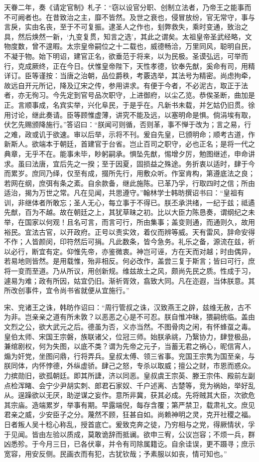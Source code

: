 \documentclass[]{article}
\begin{document}
天眷二年，奏《请定官制》札子：``窃以设官分职、创制立法者，乃帝王之能事而不可阙者也。在昔致治之主，靡不皆然。及世之衰也，侵冒放纷，官无常守，事与言戾，实由名丧，至于不可复振。逮圣人之作也，刬弊救失，乘时变通，致治之具，然后焕然一新，`九变复贯，知言之选'，其此之谓矣。太祖皇帝圣武经略，文物度数，曾不遑暇。太宗皇帝嗣位之十二载也，威德畅洽，万里同风，聪明自民，不凝于物。始下明诏，建官正名，欲垂范于将来，以为民极。圣谟弘远，可举而行，克成厥终，正在今日。伏惟皇帝陛下，天性孝德，钦奉先猷，奚命有司，用精详订。臣等谨按：当唐之治朝，品位爵秩，考覈选举，其法号为精密。尚虑拘牵，故远自开元所记，降及辽宋之传，参用讲求。有便于今者，不必泥古，取正于法者，亦无徇习。今先定到官号品次职守，上进御府，以尘乙览。恭俟圣断，曲加是正。言顺事成，名宾实举，兴化阜民，于是乎在。凡新书未载，并乞姑仍旧贯。徐用讨论，继此奏请。臣等顾惟虚薄，讲究不能及远，以塞明命是惧。倘涓埃有取，伏乞先赐颁降施行。''答诏曰：``朕闻可则循，否则革，事不惮于改为；言之易，行之难，政或讥于欲速。审以后举，示将不刊。爰自先皇，已颁明命；顺考古道，作新斯人。欲端本于朝廷，首建官于台省。岂止百司之职守，必也正名；是将一代之典章，无乎不在。能事未毕，眇躬嗣承。惧坠先猷，惕增夕厉，勉图继述，申命讲求。虽曰法唐，宜后先之一揆；至于因夏，固损益之殊途。务折衷以适时，肆于今而累岁。庶同乃绎，仅至有成，掇所先行，用敷众听。作室肯构，第遵底法之良；若网在纲，庶弭有条之紊。自余款备，继此施陈。已革乃孚，行取四时之信；所由适治，揭为万世之常。凡在见闻，共思遵守。''翰林学士韩昉撰诏书曰：``皇祖有训，非继体者所敢忘；圣人无心，每立事于不得已。朕丕承洪绪，一纪于兹；祗遹先猷，百为不越。故在朝廷之上，其犹草昧之初。比以大臣力陈恳奏，谓纲纪之未举，在国家以何观！且名可言，而言可行，所由集事；盖变则通，而通则久，故用裕民。宜法古官，以开政府。正号以责实效，着仪而辨等威。天有雷风，辞命安得不作；人皆颜闵，印符然后可捐。凡此数条，皆今急务。礼乐之备，源流在兹，祈以必行，断宜有定。仰惟先帝，亦鉴微衷。神岂可诬，方在天而对越；时由偶异，若易地则皆然。是用载惟，殆非相反。何必改作，盖尝三复于斯言；皆曰可行，庶将一变而至道。乃从所议，用创新规。维兹故土之风，颇尚先民之质。性成于习，遽易为难；政有所因，姑宜仍旧。渐祈胥效，翕致大同。凡在迩遐，当体朕意。其所改创事件，宜令尚书省就便从宜施行。''

宋、兖诸王之诛，韩昉作诏曰：``周行管叔之诛，汉致燕王之辟，兹维无赦，古不为非。岂亲亲之道有所未敦？以恶恶之心是不可忍。朕自惟冲昧，猥嗣统临。盖由文烈之公，欲大武元之后。德虽为否，义亦当然。不图骨肉之闲，有怀蜂虿之毒。皇伯太师、宋国王宗磐，族联诸父，位冠三师。始朕承祧，乃繄协力，肆登极品，兼绾剧权，何为失图，以底不类？谓为先帝之元子，当蓄无君之祸心，昵信宵人，煽为奸党，坐图问鼎，行将弄兵。皇叔太傅、领三省事。兖国王宗隽为国至亲，与朕同体，内怀悖德，外纵虚骄。肆己之怒，专杀以取威；擅公之财，市恩而惑众。力摈勋旧，欲孤朝廷。即其所誱，济以同恶。皇叔虞王宗英、滕王宗伟、殿前左副点检浑睹、会宁少尹胡实刺、郎君石家奴、千户述离、古楚等，竞为祸始，举好乱从。逞躁欲以无厌，助逆谋之妄作。意所非冀，获其必成。先将贼其大臣，次欲危其宗庙。造端累岁，举事有期。早露端倪，每存含覆；第严禁卫，载肃礼文。庶见君亲之威，少安臣子之分。蔑然不顾，狂甚自如。尚赖神明之灵，克开社稷之福。日者叛人吴十稔心称乱，授首底亡。爰致克奔之徒，乃穷相与之党，得厥情状，孚于见闻。皆由左验以质成，莫敢诡辞而抵谰。欲申三宥，公议岂容；不烦一兵，群凶悉殄。于今月三日，已各伏辜，并令有司除属籍讫。自余诖误，更不蹑寻；庶示宽容，用安反侧。民画衣而有犯，古犹钦哉；予素服以如丧，情可知也。''
\end{document}
